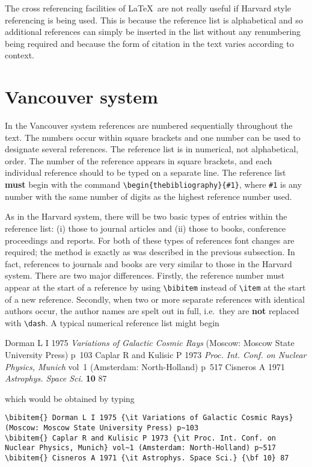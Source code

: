 The cross referencing facilities of \LaTeX\ are not really useful if
Harvard style referencing is being used. This is because the reference
list is alphabetical and so additional references can simply be inserted
in the list without any renumbering being required and because 
the form of
citation in the text varies according to context.

\section{Vancouver system}
In the Vancouver system references are numbered sequentially 
throughout the text. 
The numbers occur within square brackets and one 
number can be used to designate several references. The reference list 
is in numerical, not alphabetical, order. The number 
of the reference appears in square brackets, and each 
individual reference should to be typed on a separate line. 
The reference 
list {\bf must} begin with the command \verb"\begin{thebibliography}{#1}", 
where \verb"#1" 
is any number with the same number of digits as the highest reference 
number used. 

As in the Harvard system, there will be two basic types of entries 
within the reference list: (i) those to journal articles and (ii) 
those to books, conference proceedings and reports. For both of these 
types of references font changes are required; the method is exactly 
as was described in the previous subsection. In fact, references to 
journals and books are very similar to those in the Harvard system. 
There are two major differences. Firstly, the reference number
must appear at the start of a reference by using \verb"\bibitem"
instead of \verb"\item" at the start of a new reference. Secondly, 
when two or more separate references with identical authors occur, the 
author names are spelt 
out in full, i.e.\ they are {\bf not} replaced with \verb"\dash". A typical 
numerical reference list might begin
\begin{thebibliography}{9}
\bibitem{} Dorman L I 1975 {\it Variations of Galactic Cosmic Rays} 
(Moscow: Moscow State 
University Press) p~103
\bibitem{} Caplar R and Kulisic P 1973 {\it Proc. Int. Conf. on Nuclear 
Physics, Munich} vol~1 (Amsterdam: North-Holland) p~517
\bibitem{} Cisneros A 1971 {\it Astrophys. Space Sci.} {\bf 10} 87
\end{thebibliography}
which would be obtained by typing
\begin{verbatim}
\bibitem{} Dorman L I 1975 {\it Variations of Galactic Cosmic Rays} 
(Moscow: Moscow State University Press) p~103
\bibitem{} Caplar R and Kulisic P 1973 {\it Proc. Int. Conf. on 
Nuclear Physics, Munich} vol~1 (Amsterdam: North-Holland) p~517
\bibitem{} Cisneros A 1971 {\it Astrophys. Space Sci.} {\bf 10} 87
\end{verbatim}

